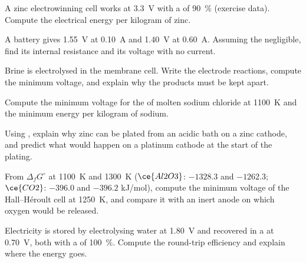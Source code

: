 \begin{exercise}[$\star\star$]\label{exo:b2:batteries-electrolysis:6}
A zinc electrowinning cell works at \qty{3.3}{V} with a  of
90~\% (exercise data). Compute the electrical energy per kilogram of zinc.
\end{exercise}

\begin{exercise}[$\star\star$]\label{exo:b2:batteries-electrolysis:7}
A battery gives \qty{1.55}{V} at \qty{0.10}{A} and \qty{1.40}{V} at \qty{0.60}{A}.
Assuming the  negligible, find its internal resistance and its
voltage with no current.
\end{exercise}

\begin{exercise}[$\star\star$]\label{exo:b2:batteries-electrolysis:8}
Brine is electrolysed in the membrane cell. Write the electrode reactions,
compute the minimum voltage, and explain why the products must be kept
apart.
\end{exercise}

\begin{exercise}[$\star\star$]\label{exo:b2:batteries-electrolysis:9}
Compute the minimum voltage for the  of molten sodium chloride at
\qty{1100}{K} and the minimum energy per kilogram of sodium.
\end{exercise}

\begin{exercise}[$\star\star\star$]\label{exo:b2:batteries-electrolysis:10}
Using , explain why zinc can be plated from an acidic
bath on a zinc cathode, and predict what would happen on a platinum cathode at
the start of the plating.
\end{exercise}

\begin{exercise}[$\star\star\star$]\label{exo:b2:batteries-electrolysis:11}
From $\Delta_f G^\circ$ at \qty{1100}{K} and \qty{1300}{K} ($\ce{Al2O3}$: $-1328.3$ and
$-1262.3$; $\ce{CO2}$: $-396.0$ and $-396.2$ \unit{kJ/mol}), compute the minimum
voltage of the Hall--Héroult cell at \qty{1250}{K}, and compare it with an
inert anode on which oxygen would be released.
\end{exercise}

\begin{exercise}[$\star\star\star$]\label{exo:b2:batteries-electrolysis:12}
Electricity is stored by electrolysing water at \qty{1.80}{V} and recovered in a
 at \qty{0.70}{V}, both with a  of 100~\%. Compute the
round-trip efficiency and explain where the energy goes.
\end{exercise}


